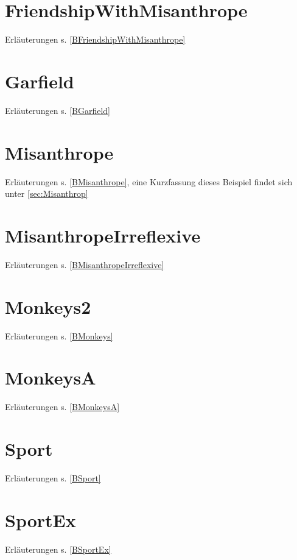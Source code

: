 \documentclass[a4paper, 11pt]{book}
\begin{document}
{\section{FriendshipWithMisanthrope} Erläuterungen s. \ref{BFriendshipWithMisanthrope}
\label{FriendshipWithMisanthrope}

\newpage

\section{Garfield}  Erläuterungen s. \ref{BGarfield}
\label{Garfield}


\newpage

\section{Misanthrope} Erläuterungen s. \ref{BMisanthrope}, eine Kurzfassung dieses Beispiel findet sich unter \ref{sec:Misanthrop}
\label{Misanthrope}

\newpage



\section{MisanthropeIrreflexive} Erläuterungen s. \ref{BMisanthropeIrreflexive}
\label{MisanthropeIrreflexive}

\newpage

\section{Monkeys2} Erläuterungen s. \ref{BMonkeys}
\label{Monkeys2}


\newpage

\section{MonkeysA} Erläuterungen s. \ref{BMonkeysA}
\label{MonkeysA}


\newpage

\section{Sport} Erläuterungen s. \ref{BSport}
\label{Sport}

\newpage

\section{SportEx} Erläuterungen s. \ref{BSportEx}
\label{SportEx}

\newpage


}
\end{document}

